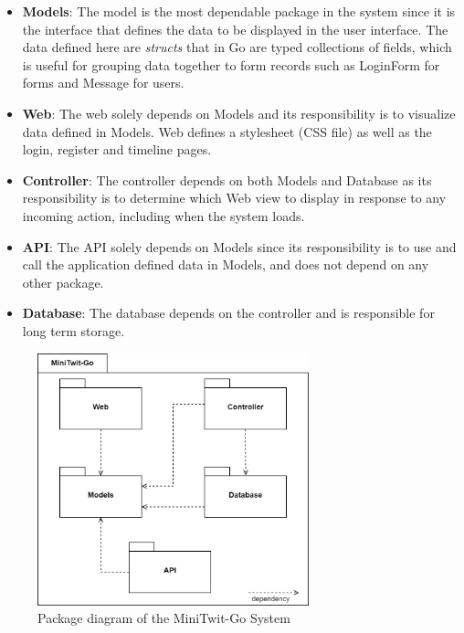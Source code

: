 \begin{itemize}
    \item \textbf{Models}: The model is the most dependable package in the system since it is the interface that defines the data to be displayed in the user interface. The data defined here are \textit{structs} that in Go are typed collections of fields, which is useful for grouping data together to form records such as LoginForm for forms and Message for users.
    \item \textbf{Web}: The web solely depends on Models and its  responsibility is to visualize data defined in Models. Web defines a stylesheet (CSS file) as well as the login, register and timeline pages.
    \item \textbf{Controller}: The controller depends on both Models and Database as its responsibility is to determine which Web view to display in response to any incoming action, including when the system loads.
    \item \textbf{API}: The API solely depends on Models since its responsibility is to use and call the application defined data in Models, and does not depend on any other package. 
    \item \textbf{Database}: The database depends on the controller and is responsible for long term storage.
\end{itemize}

\begin{figure}[ht!]
		\centering
		\includegraphics[width=0.7\textwidth]{images/packagediagram.png}
		\caption{Package diagram of the MiniTwit-Go System}
		\label{fig:packagediagram}
\end{figure}

